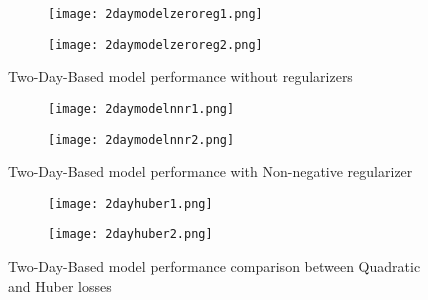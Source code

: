 \documentclass{article}
\begin{document}
\begin{figure}[h]
  \begin{subfigure}[b]{0.5\textwidth}
    \texttt{[image: 2daymodelzeroreg1.png]}
    \caption{} 
    \label{fig:f1}
  \end{subfigure}
  \hfill
  \begin{subfigure}[b]{0.5\textwidth}
    \texttt{[image: 2daymodelzeroreg2.png]}
    \caption{}
    \label{fig:f2}
  \end{subfigure}
  \caption{Two-Day-Based model performance without regularizers}
\end{figure}

\begin{figure}[h]
  \begin{subfigure}[b]{0.5\textwidth}
    \texttt{[image: 2daymodelnnr1.png]}
    \caption{} 
    \label{fig:f1}
  \end{subfigure}
  \hfill
  \begin{subfigure}[b]{0.5\textwidth}
    \texttt{[image: 2daymodelnnr2.png]}
    \caption{}
    \label{fig:f2}
  \end{subfigure}
  \caption{Two-Day-Based model performance with Non-negative regularizer}
\end{figure}

\begin{figure}[h]
  \begin{subfigure}[b]{0.5\textwidth}
    \texttt{[image: 2dayhuber1.png]}
    \caption{} 
    \label{fig:f1}
  \end{subfigure}
  \hfill
  \begin{subfigure}[b]{0.5\textwidth}
    \texttt{[image: 2dayhuber2.png]}
    \caption{}
    \label{fig:f2}
  \end{subfigure}
  \caption{Two-Day-Based model performance comparison between Quadratic and Huber losses}
\end{figure}
\end{document}

